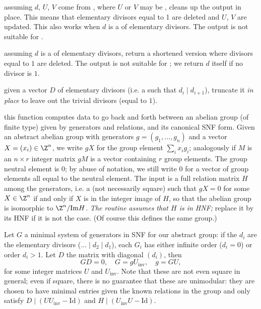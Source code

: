  assuming $d$, $U$, $V$ come
from , where $U$ or $V$ may be ,
cleans up the output in place. This means that elementary divisors equal to 1
are deleted and $U$, $V$ are updated. This also works when $d$ is a 
of elementary divisors. The output is not suitable for
.

 assuming $d$ is a  of elementary
divisors, return a shortened version where divisors equal to $1$
are deleted. The output is not suitable for ; we return
$d$ itself if no divisor is $1$.

 given a vector $D$ of elementary divisors
(i.e. a  such that $d_i \mid d_{i+1}$), truncate it \emph{in place}
to leave out the trivial divisors (equal to $1$).

 this function computes data
to go back and forth between an abelian group (of finite type) given by
generators and relations, and its canonical SNF form. Given an abstract
abelian group with generators $g = (g_1,\dots,g_n)$ and a vector
$X=(x_i)\in\Z^n$, we write $g X$ for the group element $\sum_i x_i g_i$;
analogously if $M$ is an $n\times r$ integer matrix $g M$ is a vector
containing $r$ group elements. The group neutral element is $0$; by abuse of
notation, we still write $0$ for a vector of group elements all equal to the
neutral element. The input is a full relation matrix $H$ among the
generators, i.e. a  (not necessarily square) such that $gX = 0$ for
some $X\in\Z^n$ if and only if $X$ is in the integer image of $H$, so that
the abelian group is isomorphic to $\Z^n/\text{Im} H$. \emph{The routine
assumes that $H$ is in HNF;} replace it by its HNF if it is not the case. (Of
course this defines the same group.)

Let $G$ a minimal system of generators in SNF for our abstract group:
if the $d_i$ are the elementary divisors ($\dots \mid d_2\mid d_1$), each
$G_i$ has either infinite order ($d_i = 0$) or order $d_i > 1$. Let $D$
the matrix with diagonal $(d_i)$, then
$$G D = 0,\quad G = g U_{\text{inv}},\quad g = G U,$$
for some integer matrices $U$ and $U_{\text{inv}}$. Note that these are not
even square in general; even if square, there is no guarantee that these are
unimodular: they are chosen to have minimal entries given the known relations
in the group and only satisfy $D \mid (U U_{\text{inv}} - \text{Id})$ and $H
\mid (U_{\text{inv}}U - \text{Id})$.

